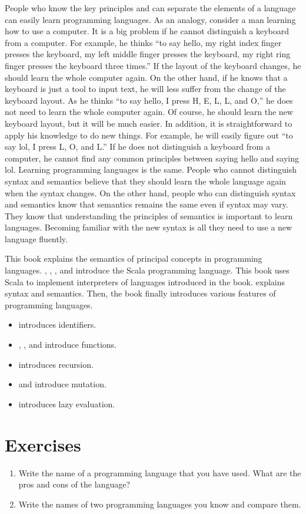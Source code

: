 People who know the key principles and can separate the elements of a language
can easily learn programming languages. As an analogy, consider a man learning
how to use a computer. It is a big problem if he cannot distinguish a keyboard
from a computer. For example, he thinks ``to say hello, my right index finger
presses the keyboard, my left middle finger presses the keyboard, my right ring
finger presses the keyboard three times.'' If the layout of the keyboard changes,
he should learn the whole computer again. On the other hand, if he knows that a
keyboard is just a tool to input text, he will less suffer from the change of
the keyboard layout. As he thinks ``to say hello, I press H, E, L, L, and O,'' he
does not need to learn the whole computer again. Of course, he should learn the
new keyboard layout, but it will be much easier. In addition, it is
straightforward to apply his knowledge to do new things. For example, he will
easily figure out ``to say lol, I press L, O, and L.'' If he does not distinguish
a keyboard from a computer, he cannot find any common principles between saying
hello and saying lol. Learning programming languages is the same. People who
cannot distinguish syntax and semantics believe that they should learn the whole
language again when the syntax changes. On the other hand, people who can
distinguish syntax and semantics know that semantics remains the same even if
syntax may vary. They know that understanding the principles of semantics is
important to learn languages. Becoming familiar with the
new syntax is all they need to use a new language fluently.

This book explains the semantics of principal concepts in programming languages.
, ,
, and 
introduce the Scala programming language. This book
uses Scala to implement interpreters of languages introduced in the book.
 explains syntax and
semantics. Then, the book finally introduces various features of programming languages.
\begin{itemize}
    \item {} introduces identifiers.
    \item {},
      , and  introduce functions.
    \item {} introduces recursion.
    \item {} and  introduce mutation.
    \item {} introduces lazy evaluation.
\end{itemize}

\section{Exercises}

\begin{enumerate}
\item Write the name of a programming language that you have used.
  What are the pros and cons of the language?
\item Write the names of two programming languages you know and compare them.
\end{enumerate}
